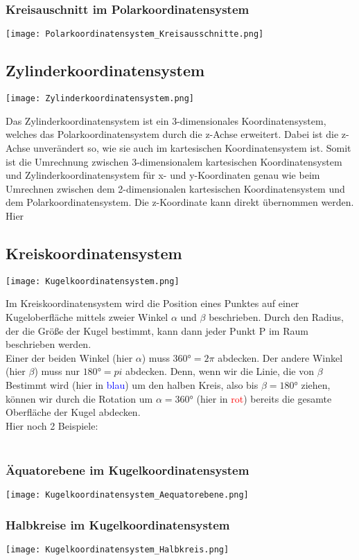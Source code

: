 \subsubsection{Kreisauschnitt im Polarkoordinatensystem}

\texttt{[image: Polarkoordinatensystem\_Kreisausschnitte.png]}


\subsection{Zylinderkoordinatensystem}

\texttt{[image: Zylinderkoordinatensystem.png]}

Das Zylinderkoordinatensystem ist ein 3-dimensionales Koordinatensystem, welches das Polarkoordinatensystem durch die z-Achse erweitert. Dabei ist die z-Achse unverändert so, wie sie auch im kartesischen Koordinatensystem ist. Somit ist die Umrechnung zwischen 3-dimensionalem kartesischen Koordinatensystem und Zylinderkoordinatensystem für x- und y-Koordinaten genau wie beim Umrechnen zwischen dem 2-dimensionalen kartesischen Koordinatensystem und dem Polarkoordinatensystem. Die z-Koordinate kann direkt übernommen werden.\\
Hier

\subsection{Kreiskoordinatensystem}

\texttt{[image: Kugelkoordinatensystem.png]}

Im Kreiskoordinatensystem wird die Position eines Punktes auf einer Kugeloberfläche mittels zweier Winkel $\alpha$ und $\beta$ beschrieben. Durch den Radius, der die Größe der Kugel bestimmt, kann dann jeder Punkt P im Raum beschrieben werden.\\
Einer der beiden Winkel (hier $\alpha$) muss $360°=2\pi$ abdecken. Der andere Winkel (hier $\beta$) muss nur $180°=pi$ abdecken. Denn, wenn wir die Linie, die von $\beta$ Bestimmt wird (hier in \textcolor{blue}{blau}) um den halben Kreis, also bis $\beta = 180°$ ziehen, können wir durch die Rotation um $\alpha = 360°$ (hier in \textcolor{red}{rot}) bereits die gesamte Oberfläche der Kugel abdecken.\\
Hier noch 2 Beispiele:\\
\\
\subsubsection{Äquatorebene im Kugelkoordinatensystem}
\texttt{[image: Kugelkoordinatensystem\_Aequatorebene.png]}

\subsubsection{Halbkreise im Kugelkoordinatensystem}

\texttt{[image: Kugelkoordinatensystem\_Halbkreis.png]}
